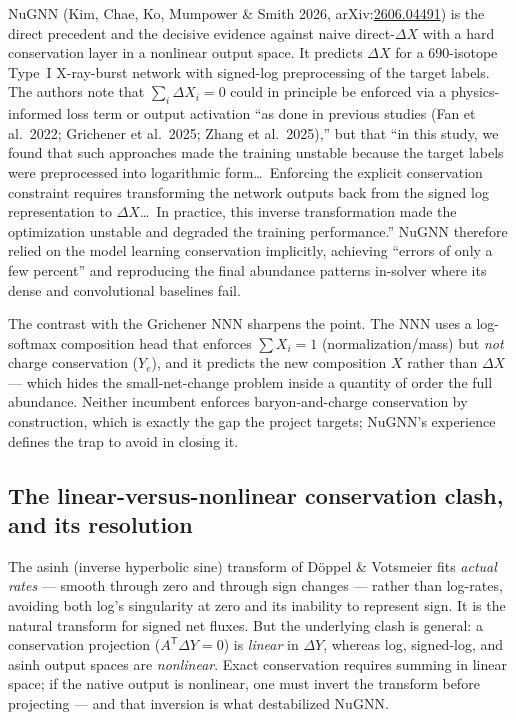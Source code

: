 \documentclass[11pt]{article}
\newcommand{\arxiv}[1]{arXiv:\href{https://arxiv.org/abs/#1}{#1}}
\begin{document}
NuGNN (Kim, Chae, Ko, Mumpower \& Smith 2026, \arxiv{2606.04491}) is the direct precedent and the decisive evidence against naive direct-$\Delta X$ with a hard conservation layer in a nonlinear output space. It predicts $\Delta X$ for a 690-isotope Type~I X-ray-burst network with signed-log preprocessing of the target labels. The authors note that $\sum_i \Delta X_i = 0$ could in principle be enforced via a physics-informed loss term or output activation ``as done in previous studies (Fan et al.\ 2022; Grichener et al.\ 2025; Zhang et al.\ 2025),'' but that ``in this study, we found that such approaches made the training unstable because the target labels were preprocessed into logarithmic form\ldots\ Enforcing the explicit conservation constraint requires transforming the network outputs back from the signed log representation to $\Delta X$\ldots\ In practice, this inverse transformation made the optimization unstable and degraded the training performance.'' NuGNN therefore relied on the model learning conservation implicitly, achieving ``errors of only a few percent'' and reproducing the final abundance patterns in-solver where its dense and convolutional baselines fail.

The contrast with the Grichener NNN sharpens the point. The NNN uses a log-softmax composition head that enforces $\sum X_i = 1$ (normalization/mass) but \emph{not} charge conservation ($Y_e$), and it predicts the new composition $X$ rather than $\Delta X$ --- which hides the small-net-change problem inside a quantity of order the full abundance. Neither incumbent enforces baryon-and-charge conservation by construction, which is exactly the gap the project targets; NuGNN's experience defines the trap to avoid in closing it.

\subsection{The linear-versus-nonlinear conservation clash, and its resolution}

The asinh (inverse hyperbolic sine) transform of D\"oppel \& Votsmeier fits \emph{actual rates} --- smooth through zero and through sign changes --- rather than log-rates, avoiding both log's singularity at zero and its inability to represent sign. It is the natural transform for signed net fluxes. But the underlying clash is general: a conservation projection ($A^{\mathsf{T}}\Delta Y = 0$) is \emph{linear} in $\Delta Y$, whereas log, signed-log, and asinh output spaces are \emph{nonlinear}. Exact conservation requires summing in linear space; if the native output is nonlinear, one must invert the transform before projecting --- and that inversion is what destabilized NuGNN.
\end{document}
